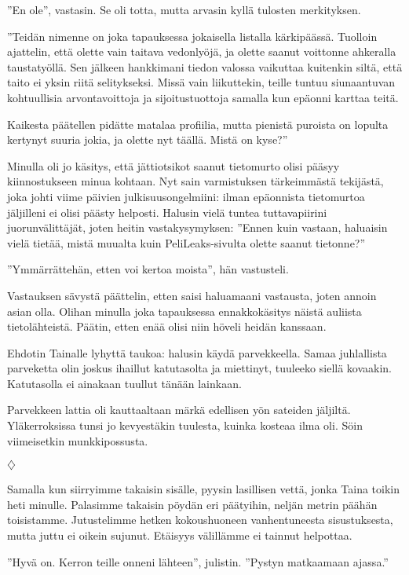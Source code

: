 ﻿\documentclass[a4paper, 12pt, finnish]{article}
\newcommand{\q}[1]{''#1''}
\def\jump{\vspace{2mm} \centerline{$\diamondsuit$} \vspace{2mm}}
\begin{document}
\q{En ole}, vastasin. Se oli totta, mutta arvasin kyllä tulosten merkityksen.

\q{Teidän nimenne on joka tapauksessa jokaisella listalla kärkipäässä.
Tuolloin ajattelin, että olette vain taitava vedonlyöjä, ja olette
saanut voittonne ahkeralla taustatyöllä. Sen jälkeen hankkimani
tiedon valossa vaikuttaa kuitenkin siltä, että taito ei yksin riitä
selitykseksi. Missä vain liikuttekin, teille tuntuu siunaantuvan kohtuullisia 
arvontavoittoja ja sijoitustuottoja samalla kun epäonni karttaa teitä.

Kaikesta päätellen pidätte matalaa profiilia, mutta pienistä
puroista on lopulta kertynyt suuria jokia, ja olette nyt täällä.
Mistä on kyse?}

Minulla oli jo käsitys, että jättiotsikot saanut tietomurto
olisi pääsyy kiinnostukseen minua kohtaan. Nyt sain varmistuksen
tärkeimmästä tekijästä, joka johti viime päivien
julkisuusongelmiini: ilman epäonnista tietomurtoa jäljilleni ei olisi
päästy helposti. Halusin vielä tuntea tuttavapiirini
juorunvälittäjät, joten heitin vastakysymyksen:
\q{Ennen kuin vastaan, haluaisin vielä tietää,
mistä muualta kuin PeliLeaks-sivulta olette saanut tietonne?}

\q{Ymmärrättehän, etten voi kertoa moista}, hän vastusteli.

Vastauksen sävystä päättelin, etten saisi haluamaani vastausta,
joten annoin asian olla.
Olihan minulla joka tapauksessa ennakkokäsitys näistä auliista
tietolähteistä. Päätin, etten enää olisi niin höveli heidän kanssaan.

Ehdotin Tainalle lyhyttä taukoa: halusin käydä parvekkeella. Samaa
juhlallista parveketta olin joskus ihaillut katutasolta
ja miettinyt, tuuleeko siellä kovaakin. Katutasolla ei ainakaan
tuullut tänään lainkaan.

Parvekkeen lattia oli kauttaaltaan märkä edellisen yön sateiden
jäljiltä. Yläkerroksissa tunsi jo kevyestäkin tuulesta, kuinka
kosteaa ilma oli. Söin viimeisetkin munkkipossusta.


\jump


Samalla kun siirryimme takaisin sisälle, pyysin lasillisen vettä,
jonka Taina toikin heti minulle. Palasimme takaisin pöydän eri
päätyihin, neljän metrin päähän toisistamme.
Jutustelimme hetken kokoushuoneen vanhentuneesta sisustuksesta,
mutta juttu ei oikein sujunut. Etäisyys välillämme ei tainnut helpottaa.

\q{Hyvä on. Kerron teille onneni lähteen}, julistin.
\q{Pystyn matkaamaan ajassa.}
\end{document}
